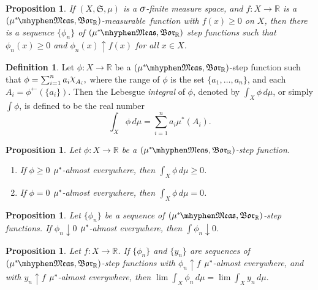 \documentclass[
twoside=true,
paper=letter,
fontsize=9pt,
pagesize=auto,
leqno,
openany,
headsepline,
overfullrule,
]{scrbook}
\theoremstyle{plain}
\theoremstyle{plain}
\newtheorem{prop}[thm]{Proposition}
\theoremstyle{definition}
\newtheorem{defn}[thm]{Definition}
\theoremstyle{bfnoteitalic}
\theoremstyle{bfnoteroman}
\newcommand{\sigalg}[1]{\mathfrak{#1}}
\newcommand{\borel}{\mathfrak{Bor}}
\newcommand{\textsigma}{\hbox{\large{$\sigma$}}\kern-1pt}
\newcommand{\charfunction}[1]{{\raisebox{2pt}{$\chi$}}_{#1}}
\newcommand{\preimage}[1]{#1^{\leftarrow}}
\newcommand{\R}{\mathbb{R}}
\newcommand{\semiring}{\sigalg{S}}
\newcommand{\measurable}[1]{{#1}\mhyphen\mathfrak{Meas}}
\newcommand{\kernast}{\ast\kern-1pt}
\newcommand{\mbmeasurable}{$(\measurable{\measure^\kernast},\borel_\R)$\hyp{}measurable}
\newcommand{\measurespace}{X}
\newcommand{\mspaceeltii}{y}
\newcommand{\measure}{\mu}
\begin{document}
\begin{prop}\label{sigma_finite_step_functions}
If $(\measurespace, \semiring, \measure)$ is a $\textsigma$-finite measure space, and $f:\measurespace\to\R$ is a \mbmeasurable\ function with $f(x)\geq 0$ on $\measurespace$, 
then there is a sequence $\{\phi_n\}$ of $(\measurable{\measure^\kernast},\borel_\R)$ step functions such that $\phi_n(x)\geq 0$ and $\phi_n(x)\uparrow f(x)$ for all $x\in\measurespace$.
\end{prop}







\begin{defn}\label{integral_step_function}
Let $\phi:\measurespace\to\R$ be a $(\measurable{\measure^\kernast},\borel_\R)$-step function such that $\phi=\sum_{i=1}^{n}a_i\charfunction{A_i},$ where the range of $\phi$ is the set $\{a_1, \ldots, a_n\}$, and each $A_i=\preimage{\phi}(\{ a_i\} )$. Then the Lebesgue \emph{integral}  of $\phi$, denoted by $\int_\measurespace\phi\,d\measure$, or simply $\int \phi$,  is defined to be the real number
\[
\int_\measurespace\phi\,d\measure = \sum_{i=1}^{n}a_i\measure^*(A_i).
\]
\end{defn}


\begin{prop}
Let $\phi:\measurespace\to\R$ be a $(\measurable{\measure^\kernast},\borel_\R)$-step function.
\begin{enumerate}
\item
If $\phi \geq 0$ $\measure^\kernast$-almost everywhere, then 
$\int_\measurespace\phi\,d\measure \geq 0$.
\item
If $\phi = 0$ $\measure^\kernast$-almost everywhere, then 
$\int_\measurespace\phi\,d\measure = 0$.
\end{enumerate}
\end{prop}


\begin{prop}\label{continuity_at_zero}
Let $\{\phi_n\}$ be a sequence of $(\measurable{\measure^\kernast},\borel_\R)$-step functions.  If $\phi_n\downarrow 0$ $\measure^\kernast$-almost everywhere, then $\int \phi_n\downarrow 0$.
\end{prop}



\begin{prop}\label{integral_is_unique}
Let $f:\measurespace\to\R$. If $\{\phi_n\}$ and $\{\mspaceeltii_n\}$ are sequences of $(\measurable{\measure^\kernast},\borel_\R)$-step functions with 
$\phi_n\uparrow f$ $\measure^\kernast$-almost everywhere, and with 
$\mspaceeltii_n\uparrow f$ $\measure^\kernast$-almost everywhere,
then 
$\lim \int_\measurespace\phi_n\,d\measure 
=
\lim \int_\measurespace\mspaceeltii_n\,d\measure.$
\end{prop}
\end{document}
